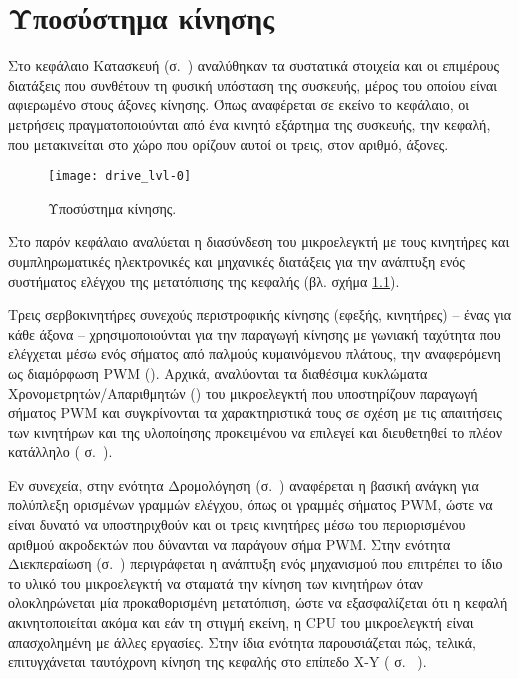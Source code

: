 
\chapter{Υποσύστημα κίνησης}
\label{ch:motor}

Στο κεφάλαιο Κατασκευή (σ.~\pageref{ch:construction}) αναλύθηκαν τα συστατικά
στοιχεία και οι επιμέρους διατάξεις που συνθέτουν τη φυσική υπόσταση της
συσκευής, μέρος του οποίου είναι αφιερωμένο στους
άξονες κίνησης. Όπως αναφέρεται σε εκείνο το κεφάλαιο, οι μετρήσεις
πραγματοποιούνται από ένα κινητό εξάρτημα της συσκευής, την κεφαλή, που
μετακινείται στο χώρο που ορίζουν αυτοί οι τρεις, στον αριθμό, άξονες.

\begin{figure}
    \caption{Υποσύστημα κίνησης.\label{fig:motor:lvl-0}}
    \begin{center}
    \texttt{[image: drive\_lvl-0]}
    \end{center}
\end{figure}

Στο παρόν κεφάλαιο αναλύεται η διασύνδεση του μικροελεγκτή με τους κινητήρες και
συμπληρωματικές ηλεκτρονικές και μηχανικές διατάξεις για την ανάπτυξη ενός
συστήματος ελέγχου της μετατόπισης της κεφαλής (βλ. σχήμα
\ref{fig:motor:lvl-0}).

Τρεις σερβοκινητήρες συνεχούς περιστροφικής κίνησης (εφεξής, κινητήρες) -- ένας
για κάθε άξονα -- χρησιμοποιούνται για την παραγωγή κίνησης με γωνιακή ταχύτητα
που ελέγχεται μέσω ενός σήματος από παλμούς κυμαινόμενου πλάτους, την
αναφερόμενη ως διαμόρφωση PWM ().
Αρχικά, αναλύονται
τα διαθέσιμα κυκλώματα Χρονομετρητών\slash{}Απαριθμητών () του μικροελεγκτή που υποστηρίζουν παραγωγή σήματος PWM και
συγκρίνονται τα χαρακτηριστικά τους σε σχέση με τις απαιτήσεις των κινητήρων και
της υλοποίησης προκειμένου να επιλεγεί και διευθετηθεί το πλέον κατάλληλο
( σ.~\pageref{sec:motor:motion}).


Εν συνεχεία, στην ενότητα Δρομολόγηση (σ.~\pageref{sec:motor:routing})
αναφέρεται η βασική ανάγκη για πολύπλεξη ορισμένων γραμμών ελέγχου, όπως οι
γραμμές σήματος PWM, ώστε να είναι δυνατό να υποστηριχθούν και οι τρεις
κινητήρες μέσω του περιορισμένου αριθμού ακροδεκτών που δύνανται να παράγουν
σήμα PWM.
Στην ενότητα Διεκπεραίωση (σ.~\pageref{subsec:motor:autoshut}) περιγράφεται η
ανάπτυξη ενός μηχανισμού που επιτρέπει το ίδιο το υλικό του μικροελεγκτή να
σταματά την κίνηση των κινητήρων όταν ολοκληρώνεται μία προκαθορισμένη
μετατόπιση, ώστε να εξασφαλίζεται ότι η κεφαλή ακινητοποιείται ακόμα και εάν τη
στιγμή εκείνη, η CPU του μικροελεγκτή είναι απασχολημένη με άλλες εργασίες.
Στην ίδια ενότητα παρουσιάζεται πώς, τελικά, επιτυγχάνεται ταυτόχρονη κίνηση της
κεφαλής στο επίπεδο X-Y ( σ.~%
\pageref{ssubsec:motor:common-translation}).

